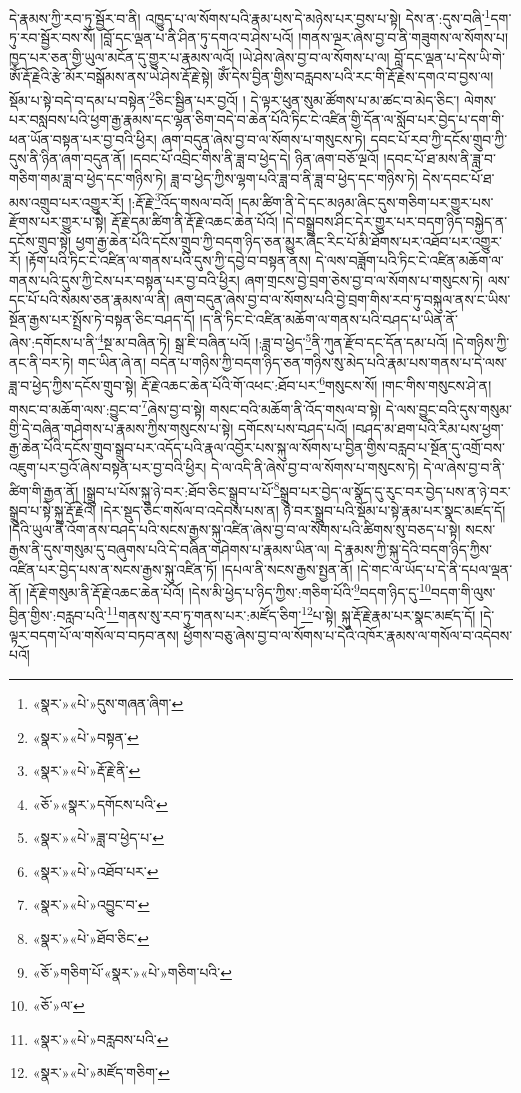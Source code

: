 དེ་རྣམས་ཀྱི་རབ་ཏུ་སྦྱོར་བ་ནི། འཁྱུད་པ་ལ་སོགས་པའི་རྣམ་པས་དེ་མཉེས་པར་བྱས་པ་སྟེ། དེས་ན་:དུས་བཞི་\footnote{«སྣར་»«པེ་»དུས་གཞན་ཞིག་}དག་ཏུ་རབ་སྦྱོར་བས་སོ། །བློ་དང་ལྡན་པ་ནི་ཤིན་ཏུ་དགའ་བ་ཤེས་པའོ། །གནས་ལྔར་ཞེས་བྱ་བ་ནི་གཟུགས་ལ་སོགས་པ། ཁྱད་པར་ཅན་གྱི་ཡུལ་མངོན་དུ་གྱུར་པ་རྣམས་ལའོ། །ཡེ་ཤེས་ཞེས་བྱ་བ་ལ་སོགས་པ་ལ། བློ་དང་ལྡན་པ་དེས་ཡི་གེ་ཨོཾ་རྡོ་རྗེའི་རྩེ་མོར་བསྒོམས་ནས་ཡེ་ཤེས་རྡོ་རྗེ་སྟེ། ཨོཾ་དེས་བྱིན་གྱིས་བརླབས་པའི་རང་གི་རྡོ་རྗེས་དགའ་བ་བྱས་ལ། སྡོམ་པ་སྟེ་བདེ་བ་དམ་པ་བསྟེན་\footnote{«སྣར་»«པེ་»བསྟན་}ཅིང་སྦྱིན་པར་བྱའོ། །
དེ་ལྟར་ཕུན་སུམ་ཚོགས་པ་མ་ཚང་བ་མེད་ཅིང་། ལེགས་པར་བསླབས་པའི་ཕྱག་རྒྱ་རྣམས་དང་ལྷན་ཅིག་བདེ་བ་ཆེན་པོའི་ཏིང་ངེ་འཛིན་གྱི་དོན་ལ་སློབ་པར་བྱེད་པ་དག་གི་ཕན་ཡོན་བསྟན་པར་བྱ་བའི་ཕྱིར། ཞག་བདུན་ཞེས་བྱ་བ་ལ་སོགས་པ་གསུངས་ཏེ། དབང་པོ་རབ་ཀྱི་དངོས་གྲུབ་ཀྱི་དུས་ནི་ཉིན་ཞག་བདུན་ནོ། །དབང་པོ་འབྲིང་གིས་ནི་ཟླ་བ་ཕྱེད་དེ། ཉིན་ཞག་བཅོ་ལྔའོ། །དབང་པོ་ཐ་མས་ནི་ཟླ་བ་གཅིག་གམ་ཟླ་བ་ཕྱེད་དང་གཉིས་ཏེ། ཟླ་བ་ཕྱེད་ཀྱིས་ལྷག་པའི་ཟླ་བ་ནི་ཟླ་བ་ཕྱེད་དང་གཉིས་ཏེ། དེས་དབང་པོ་ཐ་མས་འགྲུབ་པར་འགྱུར་རོ། །:རྡོ་རྗེ་\footnote{«སྣར་»«པེ་»རྡོ་རྗེ་ནི་}འོད་གསལ་བའོ། །དམ་ཚིག་ནི་དེ་དང་མཉམ་ཞིང་དུས་གཅིག་པར་གྱུར་པས་རྫོགས་པར་གྱུར་པ་སྟེ། རྡོ་རྗེ་དམ་ཚིག་ནི་རྡོ་རྗེ་འཆང་ཆེན་པོའོ། །དེ་བསྒྲུབས་ཤིང་དེར་གྱུར་པར་བདག་ཉིད་བསྐྱེད་ན་དངོས་གྲུབ་སྟེ། ཕྱག་རྒྱ་ཆེན་པོའི་དངོས་གྲུབ་ཀྱི་བདག་ཉིད་ཅན་མྱུར་ཞིང་རིང་པོ་མི་ཐོགས་པར་འཐོབ་པར་འགྱུར་རོ། །རྟོག་པའི་ཏིང་ངེ་འཛིན་ལ་གནས་པའི་དུས་ཀྱི་དབྱེ་བ་བསྟན་ནས། དེ་ལས་བཟློག་པའི་ཏིང་ངེ་འཛིན་མཆོག་ལ་གནས་པའི་དུས་ཀྱི་ངེས་པར་བསྟན་པར་བྱ་བའི་ཕྱིར། ཞག་གྲངས་བྱེ་བྲག་ཅེས་བྱ་བ་ལ་སོགས་པ་གསུངས་ཏེ། ལས་དང་པོ་པའི་སེམས་ཅན་རྣམས་ལ་ནི། ཞག་བདུན་ཞེས་བྱ་བ་ལ་སོགས་པའི་བྱེ་བྲག་གིས་རབ་ཏུ་བསྐུལ་ནས་ང་ཡིས་སྔོན་རྒྱས་པར་སྤྲོས་ཏེ་བསྟན་ཅིང་བཤད་དོ། །ད་ནི་ཏིང་ངེ་འཛིན་མཆོག་ལ་གནས་པའི་བཤད་པ་ཡིན་ནོ་ཞེས་:དགོངས་པ་ནི་\footnote{«ཅོ་»«སྣར་»དགོངས་པའི་}སྔ་མ་བཞིན་ཏེ། སྒྲ་ཇི་བཞིན་པའོ། །:ཟླ་བ་ཕྱེད་\footnote{«སྣར་»«པེ་»ཟླ་བ་ཕྱེད་པ་}ནི་ཀུན་རྫོབ་དང་དོན་དམ་པའོ། །དེ་གཉིས་ཀྱི་ནང་ནི་བར་ཏེ། གང་ཡིན་ཞེ་ན། བདེན་པ་གཉིས་ཀྱི་བདག་ཉིད་ཅན་གཉིས་སུ་མེད་པའི་རྣམ་པས་གནས་པ་དེ་ལས་ཟླ་བ་ཕྱེད་ཀྱིས་དངོས་གྲུབ་སྟེ། རྡོ་རྗེ་འཆང་ཆེན་པོའི་གོ་འཕང་:ཐོབ་པར་\footnote{«སྣར་»«པེ་»འཐོབ་པར་}གསུངས་སོ། །གང་གིས་གསུངས་ཤེ་ན། གསང་བ་མཆོག་ལས་:བྱུང་བ་\footnote{«སྣར་»«པེ་»འབྱུང་བ་}ཞེས་བྱ་བ་སྟེ། གསང་བའི་མཆོག་ནི་འོད་གསལ་བ་སྟེ། དེ་ལས་བྱུང་བའི་དུས་གསུམ་གྱི་དེ་བཞིན་གཤེགས་པ་རྣམས་ཀྱིས་གསུངས་པ་སྟེ། དགོངས་པས་བཤད་པའོ། །བཤད་མ་ཐག་པའི་རིམ་པས་ཕྱག་རྒྱ་ཆེན་པོའི་དངོས་གྲུབ་སྒྲུབ་པར་འདོད་པའི་རྣལ་འབྱོར་པས་སྐུ་ལ་སོགས་པ་བྱིན་གྱིས་བརླབ་པ་སྔོན་དུ་འགྲོ་བས་འཇུག་པར་བྱའོ་ཞེས་བསྟན་པར་བྱ་བའི་ཕྱིར། དེ་ལ་འདི་ནི་ཞེས་བྱ་བ་ལ་སོགས་པ་གསུངས་ཏེ། དེ་ལ་ཞེས་བྱ་བ་ནི་ཚིག་གི་རྒྱན་ནོ། །སྒྲུབ་པ་པོས་སྐུ་ཉེ་བར་:ཐོབ་ཅིང་སྒྲུབ་པ་པོ་\footnote{«སྣར་»«པེ་»ཐོབ་ཅིང་}སྒྲུབ་པར་བྱེད་ལ་སྣོད་དུ་རུང་བར་བྱེད་པས་ན་ཉེ་བར་སྒྲུབ་པ་སྟེ་སྐུ་རྡོ་རྗེའོ། །དེར་སྡུད་ཅིང་གསོལ་བ་འདེབས་པས་ན། ཉེ་བར་སྒྲུབ་པའི་སྡོམ་པ་སྟེ་རྣམ་པར་སྣང་མཛད་དོ། །དེའི་ཡུལ་ནི་འོག་ནས་བཤད་པའི་སངས་རྒྱས་སྐུ་འཛིན་ཞེས་བྱ་བ་ལ་སོགས་པའི་ཚིགས་སུ་བཅད་པ་སྟེ། སངས་རྒྱས་ནི་དུས་གསུམ་དུ་བཞུགས་པའི་དེ་བཞིན་གཤེགས་པ་རྣམས་ཡིན་ལ། དེ་རྣམས་ཀྱི་སྐུ་དེའི་བདག་ཉིད་ཀྱིས་འཛིན་པར་བྱེད་པས་ན་སངས་རྒྱས་སྐུ་འཛིན་ཏོ། །དཔལ་ནི་སངས་རྒྱས་སྤྱན་ནོ། །དེ་གང་ལ་ཡོད་པ་དེ་ནི་དཔལ་ལྡན་ནོ། །རྡོ་རྗེ་གསུམ་ནི་རྡོ་རྗེ་འཆང་ཆེན་པོའོ། །དེས་མི་ཕྱེད་པ་ཉིད་ཀྱིས་:གཅིག་པོའི་\footnote{«ཅོ་»གཅིག་པོ་«སྣར་»«པེ་»གཅིག་པའི་}བདག་ཉིད་དུ་\footnote{«ཅོ་»ལ་}བདག་གི་ལུས་བྱིན་གྱིས་:བརླབ་པའི་\footnote{«སྣར་»«པེ་»བརླབས་པའི་}གནས་སུ་རབ་ཏུ་གནས་པར་:མཛོད་ཅིག་\footnote{«སྣར་»«པེ་»མཛོད་གཅིག་}པ་སྟེ། སྐུ་རྡོ་རྗེ་རྣམ་པར་སྣང་མཛད་དོ། །དེ་ལྟར་བདག་པོ་ལ་གསོལ་བ་བཏབ་ནས། ཕྱོགས་བཅུ་ཞེས་བྱ་བ་ལ་སོགས་པ་དེའི་འཁོར་རྣམས་ལ་གསོལ་བ་འདེབས་པའོ། 